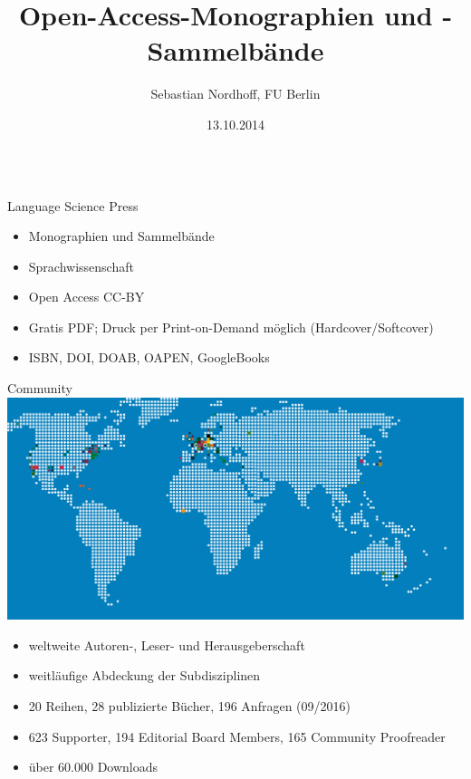 \documentclass[final,utf8]{beamer}
\title{\Huge Open-Access-Monographien und -Sammelbände}
\author{Sebastian Nordhoff, FU Berlin}
\institute[Language Science Press]{Language Science Press} %
\date{13.10.2014}
\begin{document}
\begin{frame}{} 
\vspace{-1cm}
\begin{columns}[t]
  \begin{column}{.45\linewidth}  
    \begin{block}{Language Science Press} 
	\begin{itemize}
	\item Monographien und Sammelbände
	\item Sprachwissenschaft
	\item Open Access CC-BY
	\item Gratis PDF; Druck per Print-on-Demand möglich (Hardcover/Softcover)
	\item ISBN, DOI, DOAB, OAPEN, GoogleBooks
	\end{itemize} 
    \end{block}    

    \begin{block}{Community} 
\includegraphics[width=.9\textwidth]{WORLDMAPDOTSdots.png}
	\begin{itemize} 
	    \item weltweite Autoren-, Leser- und Herausgeberschaft
	    \item weitläufige Abdeckung der Subdisziplinen
	    \item 20 Reihen, 28 publizierte Bücher, 196 Anfragen (09/2016)
	    \item 623 Supporter, 194 Editorial Board Members, 165 Community Proofreader
	    \item über 60.000 Downloads
	\end{itemize}  
    \end{block} 



\end{column}
\end{columns}
\end{frame}
\end{document}
